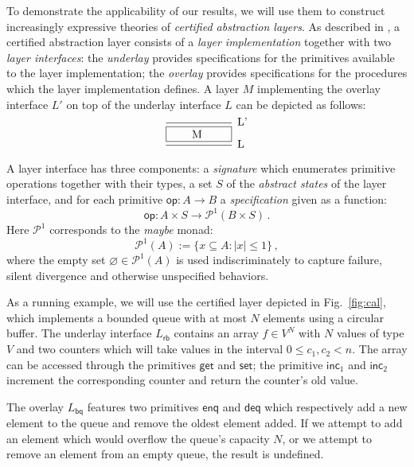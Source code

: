 \documentclass[sigplan,10pt,review,anonymous]{acmart}
\newcommand{\kw}[1]{\ensuremath{ \mathsf{#1} }}
\begin{document}
To demonstrate the applicability of our results,
we will use them to construct
increasingly expressive theories of
\emph{certified abstraction layers}.
As described in \cite{popl15},
a certified abstraction layer
consists of a \emph{layer implementation} together with
two \emph{layer interfaces}:
the \emph{underlay} provides specifications for
the primitives available to the layer implementation;
the \emph{overlay} provides specifications for
the procedures which the layer implementation defines.
A layer $M$ implementing the overlay interface $L'$
on top of the underlay interface $L$ can be depicted as follows:
\[
  \begin{prooftree}
    \infer0[L']{\fbox{\qquad M \qquad}}
    \infer1[L]{}
  \end{prooftree}
\]

A layer interface has three components:
a \emph{signature} which enumerates
primitive operations together with their types,
a set $S$ of the \emph{abstract states} of the layer interface,
and for each primitive
$\kw{op} : A \rightarrow B$
a \emph{specification}
given as a function:
\[
  \kw{op} : A \times S \rightarrow \mathcal{P}^1(B \times S) \,.
\]
Here $\mathcal{P}^1$ corresponds to the \emph{maybe} monad:
\[
  \mathcal{P}^1(A) := \{ x \subseteq A : |x| \le 1 \} \,,
\]
where the empty set $\varnothing \in \mathcal{P}^1(A)$
is used indiscriminately to capture
failure, silent divergence and otherwise unspecified behaviors.

As a running example,
we will use the certified layer
depicted in Fig.~\ref{fig:cal},
which implements a bounded queue with at most $N$ elements
using a circular buffer.
The underlay interface $L_\kw{rb}$
contains an array $f \in V^N$
with $N$ values of type $V$ and two counters
which will take values in the interval $0 \le c_1, c_2 < n$.
The array can be accessed through the primitives
$\kw{get}$ and $\kw{set}$;
the primitive $\kw{inc}_1$ and $\kw{inc}_2$
increment the corresponding counter
and return the counter's old value.

The overlay $L_\kw{bq}$ features two primitives
$\kw{enq}$ and $\kw{deq}$
which respectively add a new element to the queue
and remove the oldest element added.
If we attempt to add an element
which would overflow the queue's capacity $N$,
or we attempt to remove an element from an empty queue,
the result is undefined.
\end{document}
